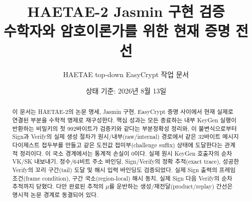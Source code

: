 \documentclass[11pt,a4paper]{article}
\title{\textbf{HAETAE-2 Jasmin 구현 검증}\\[0.4em]
  \Large 수학자와 암호이론가를 위한 현재 증명 전선}
\author{HAETAE top-down EasyCrypt 작업 문서}
\date{상태 기준: 2026년 8월 13일}
\begin{document}
\maketitle

\begin{abstract}
이 문서는 HAETAE-2의 논문 명세, Jasmin 구현, EasyCrypt 증명 사이에서 현재
실제로 연결된 부분을 수학적 명제로 재구성한다. 핵심 성과는 모든 종료하는
내부 KeyGen 실행이 반환하는 비밀키의 첫 992바이트가 검증키와 같다는
부분정확성 정리와, 이 불변식으로부터 Sign과 Verify의 실제 생성 절차가
원시/내부(raw/internal) 경로에서 같은 32바이트 메시지 다이제스트 접두부를
만들고 같은 도전값 접미부(challenge suffix) 상태에 도달한다는 관계적
정리이다. 이 국소 경계에서는 통계적 손실이 0이다. 실제 원시 KeyGen 호출자의
순차 VK/SK 내보내기, 정수/64비트 주소 바인딩, Sign/Verify의 정확 추적(exact
trace), 성공한 Verify의 꼬리 구간(tail) 도달 및 해시 입력 바인딩도 검증되었다.
실제 Sign 출력의 프레임 조건(frame condition), 구간 국소(region-local) 해시
동치, 실제 Sign 다음 Verify의 순차 추적까지 닫혔다. 다만 완료된 추적의
\(\mu\)를 운반하는 생성/재전달(product/replay) 간선은 명시적 논문 경계로
동결되어 있다.


\end{abstract}
\end{document}
